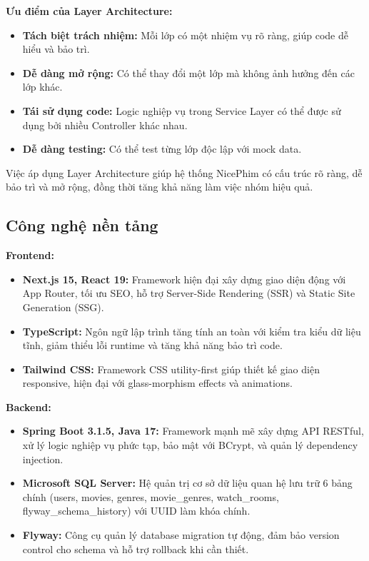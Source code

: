 \textbf{Ưu điểm của Layer Architecture:}
\begin{itemize}
	\item \textbf{Tách biệt trách nhiệm:} Mỗi lớp có một nhiệm vụ rõ ràng, giúp code dễ hiểu và bảo trì.
	\item \textbf{Dễ dàng mở rộng:} Có thể thay đổi một lớp mà không ảnh hưởng đến các lớp khác.
	\item \textbf{Tái sử dụng code:} Logic nghiệp vụ trong Service Layer có thể được sử dụng bởi nhiều Controller khác nhau.
	\item \textbf{Dễ dàng testing:} Có thể test từng lớp độc lập với mock data.
\end{itemize}

Việc áp dụng Layer Architecture giúp hệ thống NicePhim có cấu trúc rõ ràng, dễ bảo trì và mở rộng, đồng thời tăng khả năng làm việc nhóm hiệu quả.

\subsection{Công nghệ nền tảng}

\textbf{Frontend:}
\begin{itemize}
	\item \textbf{Next.js 15, React 19:} Framework hiện đại xây dựng giao diện động với App Router, tối ưu SEO, hỗ trợ Server-Side Rendering (SSR) và Static Site Generation (SSG).
	\item \textbf{TypeScript:} Ngôn ngữ lập trình tăng tính an toàn với kiểm tra kiểu dữ liệu tĩnh, giảm thiểu lỗi runtime và tăng khả năng bảo trì code.
	\item \textbf{Tailwind CSS:} Framework CSS utility-first giúp thiết kế giao diện responsive, hiện đại với glass-morphism effects và animations.
\end{itemize}

\textbf{Backend:}
\begin{itemize}
	\item \textbf{Spring Boot 3.1.5, Java 17:} Framework mạnh mẽ xây dựng API RESTful, xử lý logic nghiệp vụ phức tạp, bảo mật với BCrypt, và quản lý dependency injection.
	\item \textbf{Microsoft SQL Server:} Hệ quản trị cơ sở dữ liệu quan hệ lưu trữ 6 bảng chính (users, movies, genres, movie\_genres, watch\_rooms, flyway\_schema\_history) với UUID làm khóa chính.
	\item \textbf{Flyway:} Công cụ quản lý database migration tự động, đảm bảo version control cho schema và hỗ trợ rollback khi cần thiết.
\end{itemize}

